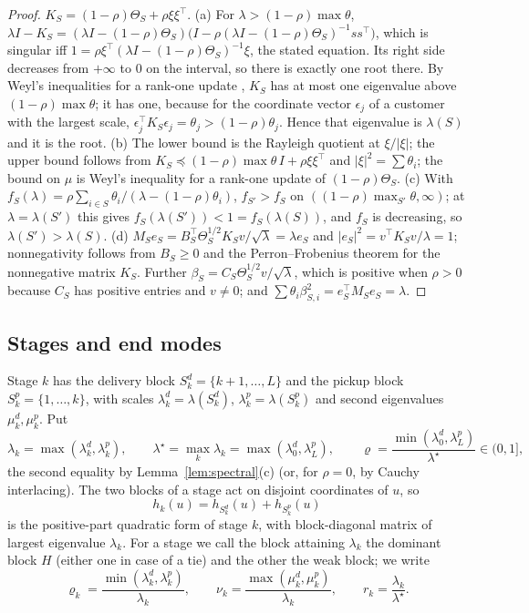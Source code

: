 \documentclass[11pt]{article}
\theoremstyle{definition}
\theoremstyle{remark}
\begin{document}
\begin{proof}
$K_S=(1-\rho)\Theta_S+\rho \xi\xi^\top$. (a) For $\lambda>(1-\rho)\max\theta$,
$\lambda I-K_S=(\lambda I-(1-\rho)\Theta_S)\big(I-\rho(\lambda I-(1-\rho)\Theta_S)^{-1}ss^\top\big)$,
which is singular iff $1=\rho \xi^\top(\lambda I-(1-\rho)\Theta_S)^{-1}\xi$, the stated
equation. Its right side decreases from $+\infty$ to $0$ on the interval, so there is
exactly one root there. By Weyl's inequalities for a rank-one update
\citep[Thm.~4.3.4]{HornJohnson2013}, $K_S$ has at most one eigenvalue above
$(1-\rho)\max\theta$; it has one, because for the coordinate vector $\epsilon_j$ of a
customer with the largest scale, $\epsilon_j^\top K_S\epsilon_j=\theta_j>(1-\rho)\theta_j$.
Hence that eigenvalue is $\lambda(S)$ and it is the root.
(b) The lower bound is the Rayleigh quotient at $\xi/|\xi|$; the upper bound
follows from $K_S\preceq(1-\rho)\max\theta\,I+\rho \xi\xi^\top$ and $|\xi|^2=\sum\theta_i$;
the bound on $\mu$ is Weyl's inequality for a rank-one update of $(1-\rho)\Theta_S$.
(c) With $f_S(\lambda)=\rho\sum_{i\in S}\theta_i/(\lambda-(1-\rho)\theta_i)$, $f_{S'}>f_S$ on
$((1-\rho)\max_{S'}\theta,\infty)$; at $\lambda=\lambda(S')$ this gives
$f_S(\lambda(S'))<1=f_S(\lambda(S))$, and $f_S$ is decreasing, so $\lambda(S')>\lambda(S)$.
(d) $M_Se_S=B_S^\top\Theta_S^{1/2}K_Sv/\sqrt{\lambda}=\lambda e_S$ and
$|e_S|^2=v^\top K_Sv/\lambda=1$; nonnegativity follows from $B_S\ge0$ and the
Perron--Frobenius theorem for the nonnegative matrix $K_S$. Further
$\beta_S=C_S\Theta_S^{1/2}v/\sqrt\lambda$, which is positive when $\rho>0$ because $C_S$ has
positive entries and $v\ne0$; and
$\sum\theta_i\beta_{S,i}^2=e_S^\top M_Se_S=\lambda$.
\end{proof}

\subsection{Stages and end modes}
Stage $k$ has the delivery block $S^d_k=\{k+1,\dots,L\}$ and the pickup block
$S^p_k=\{1,\dots,k\}$, with scales $\lambda^d_k=\lambda(S^d_k)$, $\lambda^p_k=\lambda(S^p_k)$
and second eigenvalues $\mu^d_k,\mu^p_k$. Put
\[
\lambda_k=\max(\lambda^d_k,\lambda^p_k),\qquad
\lambda^\star=\max_k\lambda_k=\max(\lambda^d_0,\lambda^p_L),\qquad
\varrho=\frac{\min(\lambda^d_0,\lambda^p_L)}{\lambda^\star}\in(0,1],
\]
the second equality by Lemma~\ref{lem:spectral}(c) (or, for $\rho=0$, by Cauchy
interlacing). The two blocks of a stage act on disjoint coordinates of $u$, so
\[
h_k(u)=h_{S^d_k}(u)+h_{S^p_k}(u)
\]
is the positive-part quadratic form of stage $k$, with block-diagonal matrix of largest
eigenvalue $\lambda_k$. For a stage we call the block attaining $\lambda_k$ the dominant
block $H$ (either one in case of a tie) and the other the weak block; we write
\[
\varrho_k=\frac{\min(\lambda^d_k,\lambda^p_k)}{\lambda_k},\qquad
\nu_k=\frac{\max(\mu^d_k,\mu^p_k)}{\lambda_k},\qquad r_k=\frac{\lambda_k}{\lambda^\star}.
\]
\end{document}
